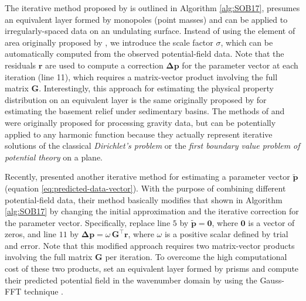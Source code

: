 \documentclass[utf8]{FrontiersinHarvard} %
\begin{document}
	The iterative method proposed by \citet{siqueira-etal2017} is outlined in Algorithm \ref{alg:SOB17},
	presumes an equivalent layer formed by monopoles (point masses) and can be applied to
	irregularly-spaced data on an undulating surface.
	Instead of using the element of area originally proposed by \citet{siqueira-etal2017}, we
	introduce the scale factor $\sigma$, which can be automatically computed from the observed potential-field data.
	Note that the residuals $\mathbf{r}$ are used to compute a correction $\boldsymbol{\Delta}\mathbf{p}$
	for the parameter vector at each iteration (line 11), which requires a matrix-vector product involving the 
	full matrix $\mathbf{G}$.
	Interestingly, this approach for estimating the physical property distribution on an equivalent layer 
	is the same originally proposed by \citet{bott1960} for estimating the basement relief under sedimentary basins.
	The methods of \citet{xia-sprowl1991} and \citet{siqueira-etal2017} were originally proposed for processing gravity data,
	but can be potentially applied to any harmonic function because they actually represent iterative solutions of the 
	classical \textit{Dirichlet’s problem} or the \textit{first boundary value problem of potential theory} 
	\cite[][ p. 236]{kellogg1967} on a plane.
	
	Recently, \citet{jirigalatu-ebbing2019} presented another iterative method for estimating a parameter 
	vector $\tilde{\mathbf{p}}$ (equation \ref{eq:predicted-data-vector}). 
	With the purpose of combining different potential-field data, 
	their method basically modifies that shown in Algorithm \ref{alg:SOB17} by changing the initial approximation 
	and the iterative correction for the parameter vector.
	Specifically, \citet{jirigalatu-ebbing2019} replace line $5$ by $\tilde{\mathbf{p}} = \mathbf{0}$, where $\mathbf{0}$ is a vector of zeros,
	and line $11$ by $\boldsymbol{\Delta}\mathbf{p} = \omega \, \mathbf{G}^{\top} \mathbf{r}$, where $\omega$ is a positive
	scalar defined by trial and error.
	Note that this modified approach requires two matrix-vector products involving the full matrix $\mathbf{G}$ per iteration.
	To overcome the high computational cost of these two products, \citet{jirigalatu-ebbing2019} set an equivalent layer formed by
	prisms and compute their predicted potential field in the wavenumber domain by using the Gauss-FFT technique
	\cite{zhao-etal2018}.
	
\end{document}
